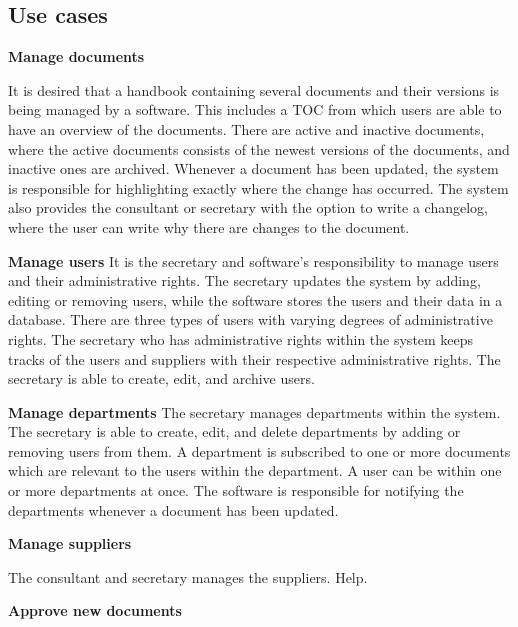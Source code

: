 \subsection{Use cases} \label{sec:usecases}

\textbf{Manage documents}

It is desired that a handbook containing several documents and their versions is being managed by a software.
This includes a TOC from which users are able to have an overview of the documents.
There are active and inactive documents, where the active documents consists of the newest versions of the documents, and inactive ones are archived.
Whenever a document has been updated, the system is responsible for highlighting exactly where the change has occurred.
The system also provides the consultant or secretary with the option to write a changelog, where the user can write why there are changes to the document.

\textbf{Manage users}
It is the secretary and software's responsibility to manage users and their administrative rights.
The secretary updates the system by adding, editing or removing users, while the software stores the users and their data in a database.
There are three types of users with varying degrees of administrative rights.
The secretary who has administrative rights within the system keeps tracks of the users and suppliers with their respective administrative rights.
The secretary is able to create, edit, and archive users.

\textbf{Manage departments}
The secretary manages departments within the system.
The secretary is able to create, edit, and delete departments by adding or removing users from them.
A department is subscribed to one or more documents which are relevant to the users within the department.
A user can be within one or more departments at once.
The software is responsible for notifying the departments whenever a document has been updated.

\textbf{Manage suppliers}

The consultant and secretary manages the suppliers. Help.

\textbf{Approve new documents}

